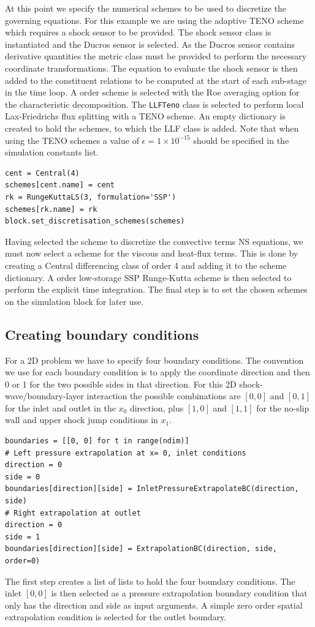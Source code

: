 \documentclass[11pt]{article}
\begin{document}
At this point we specify the numerical schemes to be used to discretize the governing equations. For this example we are using the adaptive TENO scheme which requires a shock sensor to be provided. The shock sensor class is instantiated and the Ducros sensor is selected. As the Ducros sensor contains derivative quantities the metric class must be provided to perform the necessary coordinate transformations. The equation to evaluate the shock sensor is then added to the constituent relations to be computed at the start of each sub-stage in the time loop. A  order scheme is selected with the Roe averaging option for the characteristic decomposition. The \verb|LLFTeno| class is selected to perform local Lax-Friedrichs flux splitting with a TENO scheme. An empty dictionary is created to hold the schemes, to which the LLF class is added. Note that when using the TENO schemes a value of $\epsilon = 1\times 10^{-15}$ should be specified in the simulation constants list.

\begin{lstlisting}
cent = Central(4)
schemes[cent.name] = cent
rk = RungeKuttaLS(3, formulation='SSP')
schemes[rk.name] = rk
block.set_discretisation_schemes(schemes)
\end{lstlisting}
Having selected the scheme to discretize the convective terms NS equations, we must now select a scheme for the viscous and heat-flux terms. This is done by creating a Central differencing class of order 4 and adding it to the scheme dictionary. A  order low-storage SSP Runge-Kutta scheme is then selected to perform the explicit time integration. The final step is to set the chosen schemes on the simulation block for later use.

\subsection{Creating boundary conditions}
For a 2D problem we have to specify four boundary conditions. The convention we use for each boundary condition is to apply the coordinate direction and then 0 or 1 for the two possible sides in that direction. For this 2D shock-wave/boundary-layer interaction the possible combinations are $[0,0]$ and $[0,1]$ for the inlet and outlet in the $x_0$ direction, plus $[1,0]$ and $[1,1]$ for the no-slip wall and upper shock jump conditions in $x_1$. 

\begin{lstlisting}
boundaries = [[0, 0] for t in range(ndim)]
# Left pressure extrapolation at x= 0, inlet conditions
direction = 0
side = 0
boundaries[direction][side] = InletPressureExtrapolateBC(direction, side)
# Right extrapolation at outlet
direction = 0
side = 1
boundaries[direction][side] = ExtrapolationBC(direction, side, order=0)
\end{lstlisting}
The first step creates a list of lists to hold the four boundary conditions. The inlet $[0,0]$ is then selected as a pressure extrapolation boundary condition that only has the direction and side as input arguments. A simple zero order spatial extrapolation condition is selected for the outlet boundary.
\end{document}
